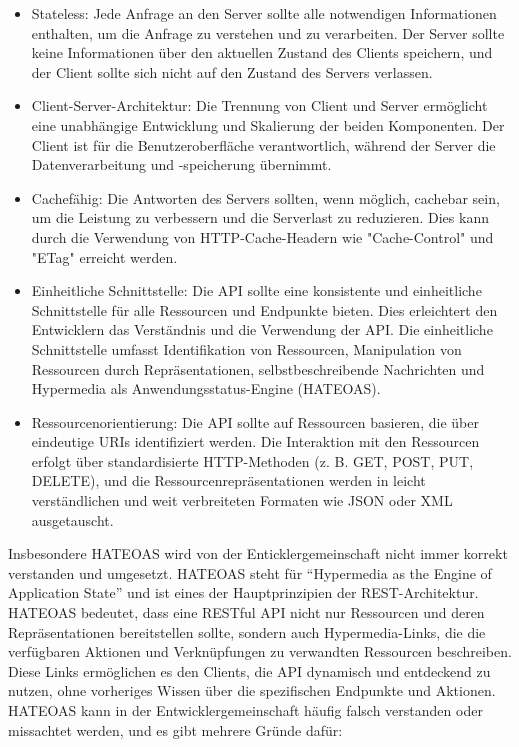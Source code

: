 \begin{itemize}
\item  Stateless: Jede Anfrage an den Server sollte alle notwendigen Informationen enthalten, um die Anfrage zu verstehen und zu verarbeiten. Der Server sollte keine Informationen über den aktuellen Zustand des Clients speichern, und der Client sollte sich nicht auf den Zustand des Servers verlassen.
\item  Client-Server-Architektur: Die Trennung von Client und Server ermöglicht eine unabhängige Entwicklung und Skalierung der beiden Komponenten. Der Client ist für die Benutzeroberfläche verantwortlich, während der Server die Datenverarbeitung und -speicherung übernimmt.
\item  Cachefähig: Die Antworten des Servers sollten, wenn möglich, cachebar sein, um die Leistung zu verbessern und die Serverlast zu reduzieren. Dies kann durch die Verwendung von HTTP-Cache-Headern wie "Cache-Control" und "ETag" erreicht werden.
\item  Einheitliche Schnittstelle: Die API sollte eine konsistente und einheitliche Schnittstelle für alle Ressourcen und Endpunkte bieten. Dies erleichtert den Entwicklern das Verständnis und die Verwendung der API. Die einheitliche Schnittstelle umfasst Identifikation von Ressourcen, Manipulation von Ressourcen durch Repräsentationen, selbstbeschreibende Nachrichten und Hypermedia als Anwendungsstatus-Engine (HATEOAS).
\item  Ressourcenorientierung: Die API sollte auf Ressourcen basieren, die über eindeutige URIs identifiziert werden. Die Interaktion mit den Ressourcen erfolgt über standardisierte HTTP-Methoden (z. B. GET, POST, PUT, DELETE), und die Ressourcenrepräsentationen werden in leicht verständlichen und weit verbreiteten Formaten wie JSON oder XML ausgetauscht.
\end{itemize}
Insbesondere HATEOAS wird von der Enticklergemeinschaft nicht immer korrekt verstanden und umgesetzt. HATEOAS steht für \enquote{Hypermedia as the Engine of Application State} und ist eines der Hauptprinzipien der REST-Architektur. HATEOAS bedeutet, dass eine RESTful API nicht nur Ressourcen und deren Repräsentationen bereitstellen sollte, sondern auch Hypermedia-Links, die die verfügbaren Aktionen und Verknüpfungen zu verwandten Ressourcen beschreiben. Diese Links ermöglichen es den Clients, die API dynamisch und entdeckend zu nutzen, ohne vorheriges Wissen über die spezifischen Endpunkte und Aktionen.
HATEOAS kann in der Entwicklergemeinschaft häufig falsch verstanden oder missachtet werden, und es gibt mehrere Gründe dafür:
